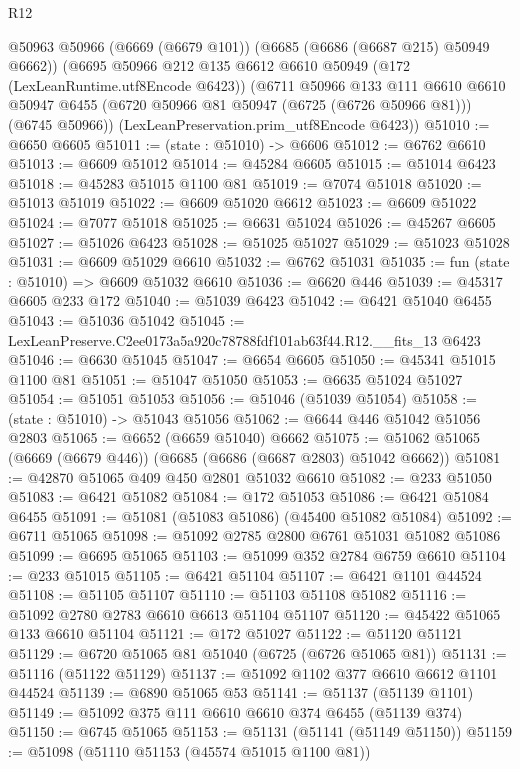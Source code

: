\begin{lexlean}{R12}
\begin{coremodule}
  @50963
    @50966
    (@6669 (@6679 @101))
    (@6685 (@6686 (@6687 @215) @50949 @6662))
    (@6695
      @50966
      @212
      @135
      @6612
      @6610
      @50949
      (@172 (LexLeanRuntime.utf8Encode @6423))
      (@6711
        @50966
        @133
        @111
        @6610
        @6610
        @50947
        @6455
        (@6720 @50966 @81 @50947 (@6725 (@6726 @50966 @81)))
        (@6745 @50966))
      (LexLeanPreservation.prim_utf8Encode @6423))
@51010 := @6650 @6605
@51011 := (state : @51010) -> @6606
@51012 := @6762 @6610
@51013 := @6609 @51012
@51014 := @45284 @6605
@51015 := @51014 @6423
@51018 := @45283 @51015 @1100 @81
@51019 := @7074 @51018
@51020 := @51013 @51019
@51022 := @6609 @51020 @6612
@51023 := @6609 @51022
@51024 := @7077 @51018
@51025 := @6631 @51024
@51026 := @45267 @6605
@51027 := @51026 @6423
@51028 := @51025 @51027
@51029 := @51023 @51028
@51031 := @6609 @51029 @6610
@51032 := @6762 @51031
@51035 := fun (state : @51010) => @6609 @51032 @6610
@51036 := @6620 @446
@51039 := @45317 @6605 @233 @172
@51040 := @51039 @6423
@51042 := @6421 @51040 @6455
@51043 := @51036 @51042
@51045 := LexLeanPreserve.C2ee0173a5a920c78788fdf101ab63f44.R12.__fits_13 @6423
@51046 := @6630 @51045
@51047 := @6654 @6605
@51050 := @45341 @51015 @1100 @81
@51051 := @51047 @51050
@51053 := @6635 @51024 @51027
@51054 := @51051 @51053
@51056 := @51046 (@51039 @51054)
@51058 := (state : @51010) -> @51043 @51056
@51062 := @6644 @446 @51042 @51056 @2803
@51065 := @6652 (@6659 @51040) @6662
@51075 := @51062 @51065 (@6669 (@6679 @446)) (@6685 (@6686 (@6687 @2803) @51042 @6662))
@51081 := @42870 @51065 @409 @450 @2801 @51032 @6610
@51082 := @233 @51050
@51083 := @6421 @51082
@51084 := @172 @51053
@51086 := @6421 @51084 @6455
@51091 := @51081 (@51083 @51086) (@45400 @51082 @51084)
@51092 := @6711 @51065
@51098 := @51092 @2785 @2800 @6761 @51031 @51082 @51086
@51099 := @6695 @51065
@51103 := @51099 @352 @2784 @6759 @6610
@51104 := @233 @51015
@51105 := @6421 @51104
@51107 := @6421 @1101 @44524
@51108 := @51105 @51107
@51110 := @51103 @51108 @51082
@51116 := @51092 @2780 @2783 @6610 @6613 @51104 @51107
@51120 := @45422 @51065 @133 @6610 @51104
@51121 := @172 @51027
@51122 := @51120 @51121
@51129 := @6720 @51065 @81 @51040 (@6725 (@6726 @51065 @81))
@51131 := @51116 (@51122 @51129)
@51137 := @51092 @1102 @377 @6610 @6612 @1101 @44524
@51139 := @6890 @51065 @53
@51141 := @51137 (@51139 @1101)
@51149 := @51092 @375 @111 @6610 @6610 @374 @6455 (@51139 @374)
@51150 := @6745 @51065
@51153 := @51131 (@51141 (@51149 @51150))
@51159 := @51098 (@51110 @51153 (@45574 @51015 @1100 @81))

\end{coremodule}
\end{lexlean}
